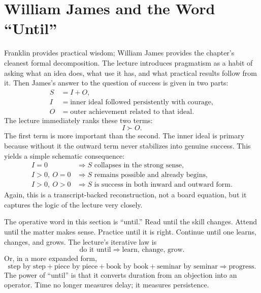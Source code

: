 \section{William James and the Word ``Until''}

Franklin provides practical wisdom; William James provides the chapter's cleanest formal decomposition. The lecture introduces pragmatism as a habit of asking what an idea does, what use it has, and what practical results follow from it. Then James's answer to the question of success is given in two parts:
\begin{align}
S &= I + O,\\
I &= \text{inner ideal followed persistently with courage},\\
O &= \text{outer achievement related to that ideal}.
\end{align}
The lecture immediately ranks these two terms:
\begin{equation}
I \succ O.
\end{equation}
The first term is more important than the second. The inner ideal is primary because without it the outward term never stabilizes into genuine success. This yields a simple schematic consequence:
\begin{align}
I=0 &\Rightarrow S \text{ collapses in the strong sense},\\
I>0,\ O=0 &\Rightarrow S \text{ remains possible and already begins},\\
I>0,\ O>0 &\Rightarrow S \text{ is success in both inward and outward form}.
\end{align}
Again, this is a transcript-backed reconstruction, not a board equation, but it captures the logic of the lecture very closely.

The operative word in this section is ``until.'' Read until the skill changes. Attend until the matter makes sense. Practice until it is right. Continue until one learns, changes, and grows. The lecture's iterative law is
\begin{equation}
\text{do it until} \Rightarrow \text{learn, change, grow}.
\end{equation}
Or, in a more expanded form,
\begin{equation}
\text{step by step}+\text{piece by piece}+\text{book by book}+\text{seminar by seminar}
\Rightarrow
\text{progress}.
\end{equation}
The power of ``until'' is that it converts duration from an objection into an operator. Time no longer measures delay; it measures persistence.

